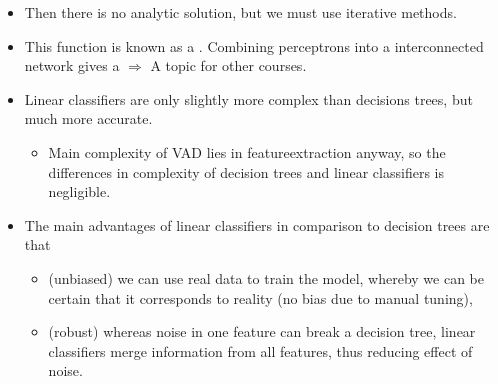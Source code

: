 \documentclass[letterpaper,10pt,english]{jupyterBook}
\begin{document}
\sphinxAtStartPar
{}
\begin{itemize}
\item {} 
\sphinxAtStartPar
Then there is no analytic solution, but we must use iterative
methods.

\item {} 
\sphinxAtStartPar
This function is known as a . Combining perceptrons into
a interconnected network gives a \(\Rightarrow\) A topic for other courses.

\item {} 
\sphinxAtStartPar
Linear classifiers are only slightly more complex than decisions
trees, but much more accurate.
\begin{itemize}
\item {} 
\sphinxAtStartPar
Main complexity of VAD lies in feature\sphinxhyphen{}extraction anyway, so the
differences in complexity of decision trees and linear
classifiers is negligible.

\end{itemize}

\item {} 
\sphinxAtStartPar
The main advantages of linear classifiers in comparison to decision
trees are that
\begin{itemize}
\item {} 
\sphinxAtStartPar
(unbiased) we can use real data to train the model, whereby we
can be certain that it corresponds to reality (no bias due to
manual tuning),

\item {} 
\sphinxAtStartPar
(robust) whereas noise in one feature can break a decision tree,
linear classifiers merge information from all features, thus
reducing effect of noise.

\end{itemize}

\end{itemize}
\end{document}
